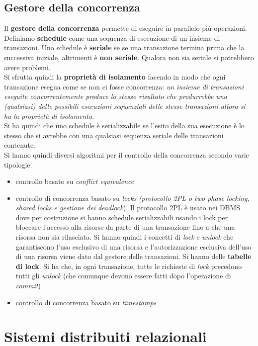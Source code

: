 \documentclass[a4paper,12pt, oneside]{book}
\begin{document}
\section{Gestore della concorrenza}
Il \textbf{gestore della concorrenza} permette di eseguire in parallelo più
operazioni.\\
Definiamo \textbf{schedule} come una sequenza di esecuzione di un insieme di
transazioni. Uno schedule è \textbf{seriale} se se una transazione  termina
prima che la successiva iniziale, altrimenti è \textbf{non seriale}. Qualora non
sia seriale si potrebbero avere problemi.\\
Si sfrutta quindi la \textbf{proprietà di isolamento} facendo in modo che ogni
transazione esegua come se non ci fosse concorrenza: \textit{un insieme di
  transazioni eseguite concorrentemente produce lo stesso risultato che
  produrrebbe una (qualsiasi) delle possibili esecuzioni sequenziali delle stesse
  transazioni allora si ha la proprietà di isolamento}.\\
Si ha quindi che uno schedule è serializzabile se l'esito della sua esecuzione è
lo stesso che si avrebbe con una qualsiasi sequenza seriale delle transazioni
contenute.\\
Si hanno quindi diversi algoritmi per il controllo della concorrenza secondo
varie tipologie:
\begin{itemize}
  \item controllo basato su \textit{conflict equivalence}
  \item controllo di concorrenza basato su \textit{locks} \textit{(protocollo
    2PL o two phase locking, shared locks e gestione dei deadlock}). Il
  protocollo 2PL è usato nei DBMS dove per costruzione si hanno schedule
  serializzabili usando i lock per  bloccare l'accesso alla risorse da parte di
  una transazione fino a che una risorsa non sia rilasciata. Si hanno quindi i
  concetti di \textit{lock} e \textit{unlock} che garantiscono l'uso esclusivo
  di una risorsa e l'autorizzazione esclusiva dell'uso di una risorsa viene dato
  dal gestore delle transazioni. Si hanno delle \textbf{tabelle di lock}. Si ha
  che, in ogni transazione, tutte le richieste di \textit{lock} precedono tutti
  gli \textit{unlock} (che comunque devono essere fatti dopo l'operazione di
  \textit{commit}) 
  \item controllo di concorrenza basato su \textit{timestamps}
\end{itemize}
\chapter{Sistemi distribuiti relazionali}
\end{document}
